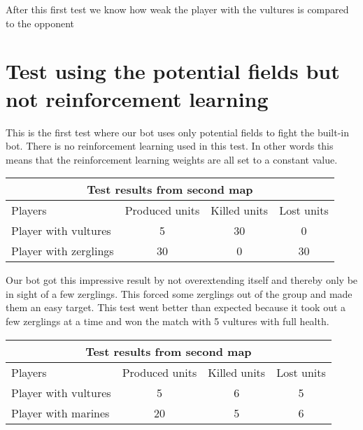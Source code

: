 After this first test we know how weak the player with the vultures is compared to the opponent
\section{Test using the potential fields but not reinforcement learning} %
This is the first test where our bot uses only potential fields  to fight the built-in bot. There is no reinforcement learning used in this test. In other words this means that the reinforcement learning weights are all set to a constant value.\\

\begin{centering}
\begin{table}
 \begin{tabular}{|l|c|c|c|}
	\multicolumn{4}{c}{Test results from second map} \\
	\hline
	Players & Produced units & Killed units & Lost units\\
	\hline
	\hline
		Player with vultures & 5 & 30 & 0\\
	\hline
		Player with zerglings & 30 & 0 & 30\\
	\hline

\end{tabular}
\end{table}
\end{centering}

Our bot got this impressive result by not overextending itself and thereby only be in sight of a few zerglings. This forced some zerglings out of the group and made them an easy target. This test went better than expected because it took out a few zerglings at a time and won the match with 5 vultures with full health.\\

\begin{centering}
\begin{table}
 \begin{tabular}{|l|c|c|c|}
	\multicolumn{4}{c}{Test results from second map} \\
	\hline
	Players & Produced units & Killed units & Lost units\\
	\hline
	\hline
		Player with vultures & 5 & 6 & 5\\
	\hline
		Player with marines & 20 & 5 & 6\\
	\hline

\end{tabular}
\end{table}
\end{centering}



